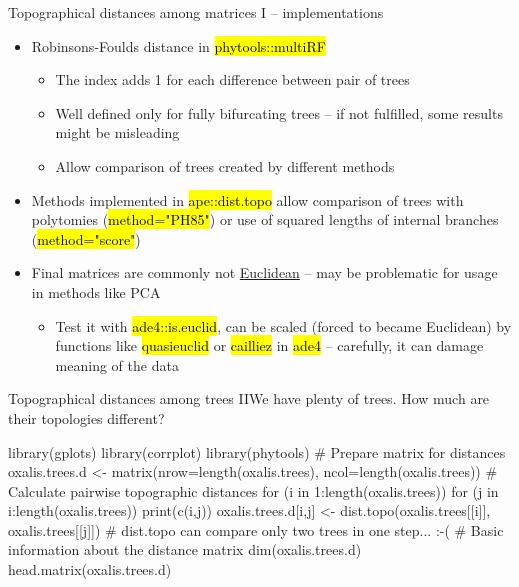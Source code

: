 \documentclass[compress, ucs, xelatex, 11pt, xcolor=svgnames,
  hyperref={
    bookmarks=true,
    unicode=true,
    colorlinks=true,
    pdftitle={Molecular data in R},
    plainpages=false,
    pdfauthor={Vojtech Zeisek},
    pdfsubject={Course about phylogeny and evolution in R},
    pdfcreator={XeLaTeX},
    pdfkeywords={R, evolution, phylogeny, molecular data},
    linkcolor=Tomato,
    anchorcolor=SaddleBrown,
    citecolor=Goldenrod,
    filecolor=DarkMagenta,
    menucolor=Sienna,
    urlcolor=DarkTurquoise,
    pdftex},
  url={hyphens, lowtilde} %
  ]{beamer}
\renewcommand{\texttt}[1]{\hl{\ttfamily #1}}
\begin{document}
\begin{frame}{Topographical distances among matrices I -- implementations}
  \begin{itemize}
    \item Robinsons-Foulds distance in \texttt{phytools::multiRF}
    \begin{itemize}
      \item The index adds 1 for each difference between pair of trees
      \item Well defined only for fully bifurcating trees -- if not fulfilled, some results might be misleading
      \item Allow comparison of trees created by different methods
    \end{itemize}
    \item Methods implemented in \texttt{ape::dist.topo} allow comparison of trees with polytomies (\texttt{method="PH85"}) or use of squared lengths of internal branches (\texttt{method="score"})
    \item Final matrices are commonly not \href{https://en.wikipedia.org/wiki/Euclidean_distance_matrix}{Euclidean} -- may be problematic for usage in methods like PCA
    \begin{itemize}
      \item Test it with \texttt{ade4::is.euclid}, can be scaled (forced to became Euclidean) by functions like \texttt{quasieuclid} or \texttt{cailliez} in \texttt{ade4} -- carefully, it can damage meaning of the data
    \end{itemize}
  \end{itemize}
\end{frame}

\begin{frame}[fragile]{Topographical distances among trees II}{We have plenty of trees. How much are their topologies different?}
  \begin{spluscode}
    library(gplots)
    library(corrplot)
    library(phytools)
    # Prepare matrix for distances
    oxalis.trees.d <- matrix(nrow=length(oxalis.trees),
      ncol=length(oxalis.trees))
    # Calculate pairwise topographic distances
    for (i in 1:length(oxalis.trees)) {
      for (j in i:length(oxalis.trees)) {
        print(c(i,j))
        oxalis.trees.d[i,j] <- dist.topo(oxalis.trees[[i]],
          oxalis.trees[[j]])
      }
    } # dist.topo can compare only two trees in one step... :-(
    # Basic information about the distance matrix
    dim(oxalis.trees.d)
    head.matrix(oxalis.trees.d)
  \end{spluscode}
\end{frame}
\end{document}

